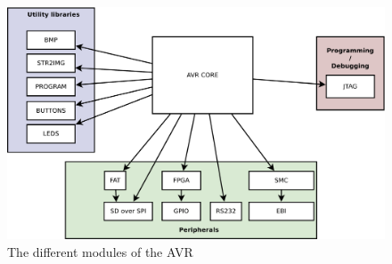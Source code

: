 \begin{figure}[h!]
\centering
\includegraphics[width=1.0\textwidth]{fig/avr/modules.pdf}
\caption[AVR Modules]{The different modules of the AVR}
\label{fig:avr-modules}
\end{figure}
